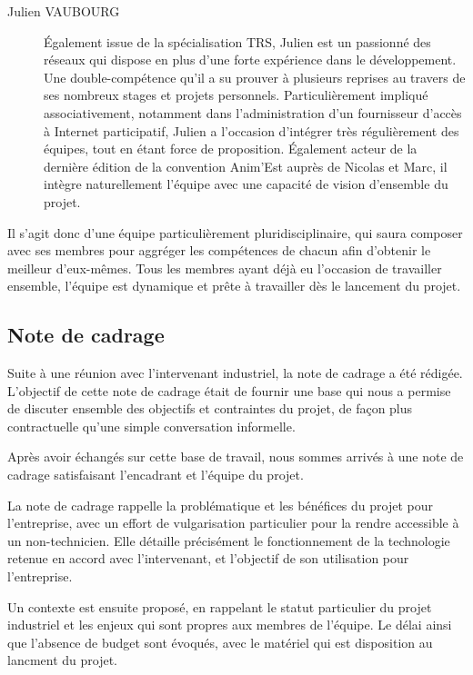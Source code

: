 \begin{description}
\item[Julien VAUBOURG] Également issue de la spécialisation TRS, Julien est un passionné des réseaux qui dispose en plus d'une forte expérience dans le développement. Une double-compétence qu'il a su prouver à plusieurs reprises au travers de ses nombreux stages et projets personnels. Particulièrement impliqué associativement, notamment dans l'administration d'un fournisseur d'accès à Internet participatif, Julien a l'occasion d'intégrer très régulièrement des équipes, tout en étant force de proposition. Également acteur de la dernière édition de la convention Anim'Est auprès de Nicolas et Marc, il intègre naturellement l'équipe avec une capacité de vision d'ensemble du projet.
\end{description}

Il s'agit donc d'une équipe particulièrement pluridisciplinaire, qui saura composer avec ses membres pour aggréger les compétences de chacun afin d'obtenir le meilleur d'eux-mêmes. Tous les membres ayant déjà eu l'occasion de travailler ensemble, l'équipe est dynamique et prête à travailler dès le lancement du projet.

\subsection{Note de cadrage}

Suite à une réunion avec l'intervenant industriel, la note de cadrage a été rédigée. L'objectif de cette note de cadrage était de fournir une base qui nous a permise de discuter ensemble des objectifs et contraintes du projet, de façon plus contractuelle qu'une simple conversation informelle.

Après avoir échangés sur cette base de travail, nous sommes arrivés à une note de cadrage satisfaisant l'encadrant et l'équipe du projet.

La note de cadrage rappelle la problématique et les bénéfices du projet pour l'entreprise, avec un effort de vulgarisation particulier pour la rendre accessible à un non-technicien. Elle détaille précisément le fonctionnement de la technologie retenue en accord avec l'intervenant, et l'objectif de son utilisation pour l'entreprise. 

Un contexte est ensuite proposé, en rappelant le statut particulier du projet industriel et les enjeux qui sont propres aux membres de l'équipe. Le délai ainsi que l'absence de budget sont évoqués, avec le matériel qui est disposition au lancment du projet.

